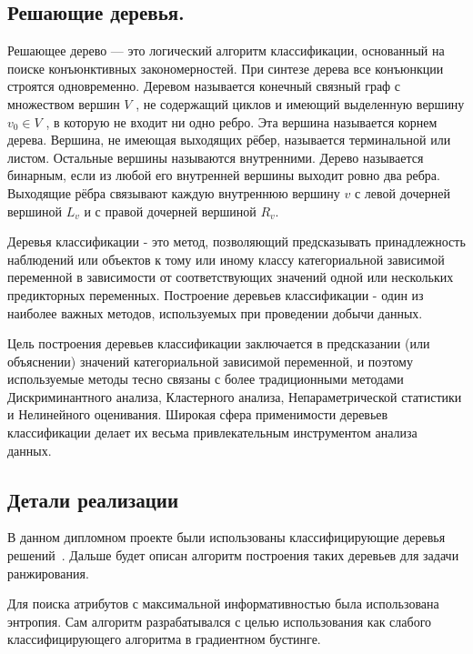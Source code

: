 \subsection{Решающие деревья.}

Решающее дерево — это логический алгоритм классификации, основанный на поиске конъюнктивных закономерностей. При синтезе дерева все конъюнкции строятся одновременно. Деревом называется конечный связный граф с множеством вершин $V$ , не содержащий циклов и имеющий выделенную вершину $v_0 \in V$ , в которую не входит ни одно ребро. Эта вершина называется корнем дерева. Вершина, не имеющая выходящих рёбер, называется терминальной или листом. Остальные вершины называются внутренними. Дерево называется бинарным, если из любой его внутренней вершины выходит ровно два ребра. Выходящие рёбра связывают каждую внутреннюю вершину $v$ с левой дочерней вершиной $L_v$ и $с$ правой дочерней вершиной $R_v$.

Деревья классификации - это метод, позволяющий предсказывать принадлежность наблюдений или объектов к тому или иному классу категориальной зависимой переменной в зависимости от соответствующих значений одной или нескольких предикторных переменных. Построение деревьев классификации - один из наиболее важных методов, используемых при проведении добычи данных.

Цель построения деревьев классификации заключается в предсказании (или объяснении) значений категориальной зависимой переменной, и поэтому используемые методы тесно связаны с более традиционными методами Дискриминантного анализа, Кластерного анализа, Непараметрической статистики и Нелинейного оценивания. Широкая сфера применимости деревьев классификации делает их весьма привлекательным инструментом анализа данных.

\subsection{Детали реализации}

В данном дипломном проекте были использованы классифицирующие деревья решений~\cite{cart_book}. Дальше будет описан алгоритм построения таких деревьев для задачи ранжирования.

Для поиска атрибутов с максимальной информативностью была использована энтропия. Сам алгоритм разрабатывался с целью использования как слабого классифицирующего алгоритма в градиентном бустинге.

